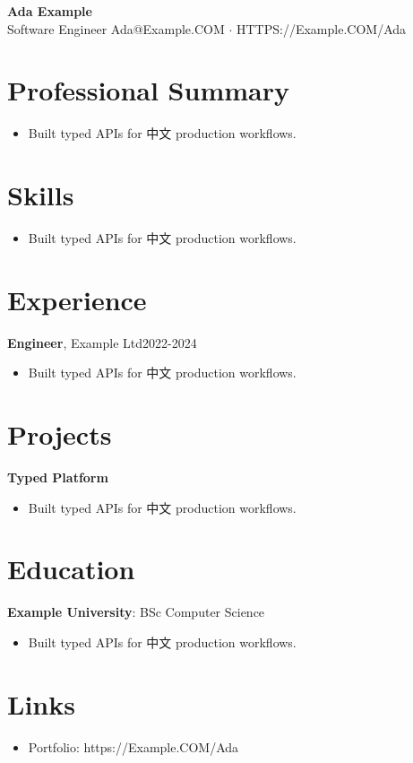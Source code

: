 \documentclass[11pt]{article}
\begin{document}
\begin{center}
{\Large \textbf{Ada Example}}\\
Software Engineer
Ada@Example.COM $\cdot$ HTTPS://Example.COM/Ada
\end{center}

\section{Professional Summary}
\begin{itemize}
\item Built typed APIs for 中文 production workflows.
\end{itemize}

\section{Skills}
\begin{itemize}
\item Built typed APIs for 中文 production workflows.
\end{itemize}

\section{Experience}
\textbf{Engineer}, Example Ltd\hfill 2022-2024
\begin{itemize}
\item Built typed APIs for 中文 production workflows.
\end{itemize}

\section{Projects}
\textbf{Typed Platform}
\begin{itemize}
\item Built typed APIs for 中文 production workflows.
\end{itemize}

\section{Education}
\textbf{Example University}: BSc Computer Science
\begin{itemize}
\item Built typed APIs for 中文 production workflows.
\end{itemize}

\section{Links}
\begin{itemize}
\item Portfolio: https://Example.COM/Ada
\end{itemize}
\end{document}
